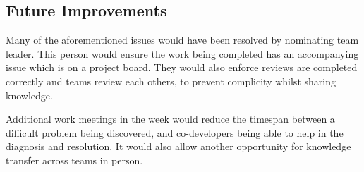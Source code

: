 \subsection{Future Improvements}
Many of the aforementioned issues would have been resolved by nominating team leader. This person would ensure the work being completed has an accompanying issue which is on a project board. They would also enforce reviews are completed correctly and teams review each others, to prevent complicity whilst sharing knowledge.

\par
Additional work meetings in the week would reduce the timespan between a difficult problem being discovered, and co-developers being able to help in the diagnosis and resolution. It would also allow another opportunity for knowledge transfer across teams in person.
